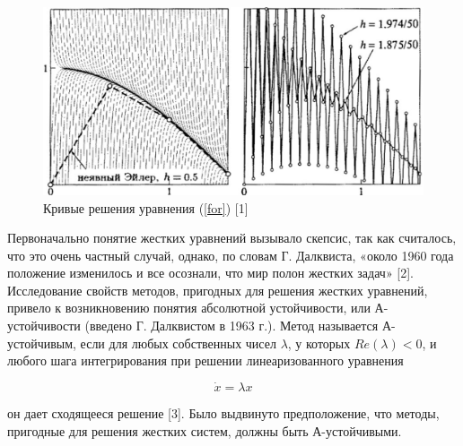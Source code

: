 \documentclass[12pt,a4paper]{book}
\begin{document}
\begin{figure}[h!]
	\centering
	\includegraphics[width=0.7\linewidth]{eulers}
	\caption[eur]{Кривые решения уравнения (\ref{for}) [1]}
	\label{fig:eulers}
\end{figure}
\newpage
Первоначально понятие жестких уравнений вызывало скепсис, так как считалось, что это очень частный случай, однако, по словам Г. Далквиста, «около 1960 года положение изменилось и все осознали, что мир полон жестких задач» [2].
Исследование свойств методов, пригодных для решения жестких уравнений, привело к возникновению понятия абсолютной устойчивости, или А-устойчивости (введено Г. Далквистом в 1963 г.). Метод называется А-устойчивым, если для любых собственных чисел $\lambda $, $ у $ которых $ Re(\lambda)<0 $, и любого шага интегрирования при решении линеаризованного уравнения

\begin{equation}
\dot{x} = \lambda x
\label{for2}
\end{equation}

он дает сходящееся решение [3]. Было выдвинуто предположение, что методы, пригодные для решения жестких систем, должны быть А-устойчивыми. 
\end{document}
